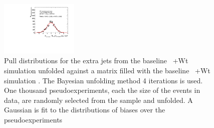 \begin{figure}
\includegraphics[width=0.33\textwidth]{fig/UnfoldPull/SingleSlicePull15.pdf}
\caption{Pull distributions for the extra jets from the baseline \ttbar\ +Wt simulation unfolded against a matrix filled with the baseline \ttbar\ +Wt simulation . The Bayesian unfolding method 4 iterations is used. One thousand pseudoexperiments, each the size of the events in data, are randomly selected from the sample and unfolded.  A Gaussian is fit to the distributions of biases over the pseudoexperiments}
\label{fig:appPull0}
\end{figure}
